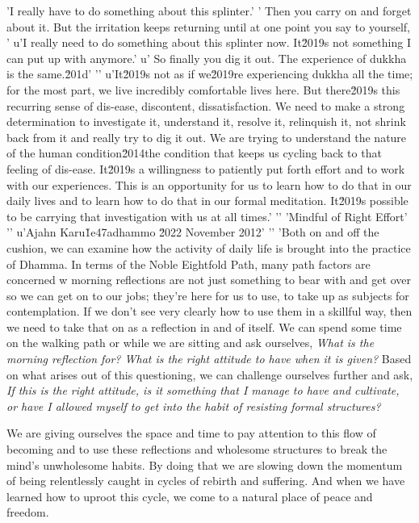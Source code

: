 'I really have to do something about this splinter.'
' Then you carry on and forget about it. But the irritation keeps returning until at one point you say to yourself, '
u'I really need to do something about this splinter now. It\u2019s not something I can put up with anymore.'
u' So finally you dig it out. The experience of dukkha is the same.\u201d'
'\n'
u'It\u2019s not as if we\u2019re experiencing dukkha all the time; for the most part, we live incredibly comfortable lives here. But there\u2019s this recurring sense of dis-ease, discontent, dissatisfaction. We need to make a strong determination to investigate it, understand it, resolve it, relinquish it, not shrink back from it and really try to dig it out. We are trying to understand the nature of the human condition\u2014the condition that keeps us cycling back to that feeling of dis-ease. It\u2019s a willingness to patiently put forth effort and to work with our experiences. This is an opportunity for us to learn how to do that in our daily lives and to learn how to do that in our formal meditation. It\u2019s possible to be carrying that investigation with us at all times.'
'\n'
'Mindful of Right Effort'
'\n'
u'Ajahn Karu\u1e47adhammo \u2022 November 2012'
'\n'
'Both on and off the cushion, we can examine how the activity of daily life is brought into the practice of Dhamma. In terms of the Noble Eightfold Path, many path factors are concerned w morning reflections are not just something to bear with and get 
over so we can get on to our jobs; they're here for us to use, to take 
up as subjects for contemplation. If we don't see very clearly how to 
use them in a skillful way, then we need to take that on as a 
reflection in and of itself. We can spend some time on the walking path 
or while we are sitting and ask ourselves, \emph{What is the morning 
reflection for? What is the right attitude to have when it is given?} 
Based on what arises out of this questioning, we can challenge 
ourselves further and ask, \emph{If this is the right attitude, is it 
something that I manage to have and cultivate, or have I allowed myself 
to get into the habit of resisting formal structures?}

We are giving ourselves the space and time to pay attention to this 
flow of becoming and to use these reflections and wholesome structures 
to break the mind's unwholesome habits. By doing that we are slowing 
down the momentum of being relentlessly caught in cycles of rebirth and 
suffering. And when we have learned how to uproot this cycle, we come 
to a natural place of peace and freedom.

